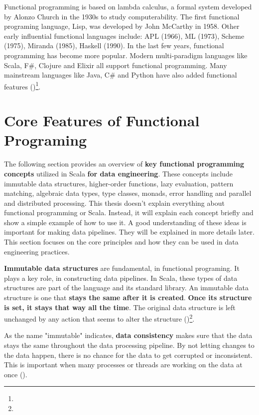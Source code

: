 Functional programming is based on lambda calculus, a formal system developed by Alonzo Church in the 1930s to study computerability. The first functional programing language, Lisp, was developed by John McCarthy in 1958. Other early influential functional languages include: APL (1966), ML (1973), Scheme (1975), Miranda (1985), Haskell (1990). In the last few years, functional programming has become more popular. Modern multi-paradigm languages like Scala, F\#, Clojure and Elixir all support functional programming. Many mainstream languages like Java, C\# and Python have also added functional features (\cite{Kunasaikaran2016ABO})\footnote[6]{}.

\section{Core Features of Functional Programing}

The following section provides an overview of \textbf{key functional programming concepts} utilized in Scala \textbf{for data engineering}. These concepts include immutable data structures, higher-order functions, lazy evaluation, pattern matching, algebraic data types, type classes, monads, error handling and parallel and distributed processing. This thesis doesn't explain everything about functional programming or Scala. Instead, it will explain each concept briefly and show a simple example of how to use it. A good understanding of these ideas is important for making data pipelines. They will be explained in more details later. This section focuses on the core principles and how they can be used in data engineering practices.

\textbf{Immutable data structures} are fundamental, in functional programing. It plays a key role, in constructing data pipelines. In Scala, these types of data structures are part of the language and its standard library. An immutable data structure is one that \textbf{stays the same after it is created}. \textbf{Once its structure is set, it stays that way all the time}. The original data structure is left unchanged by any action that seems to alter the structure (\cite{zibinObjectReferenceImmutability2007})\footnote[7]{}.

As the name "immutable" indicates, \textbf{data consistency} makes sure that the data stays the same throughout the data processing pipeline. By not letting changes to the data happen, there is no chance for the data to get corrupted or inconsistent. This is important when many processes or threads are working on the data at once (\cite{milewskiFunctionalDataStructures2013})\footnotemark[8].

